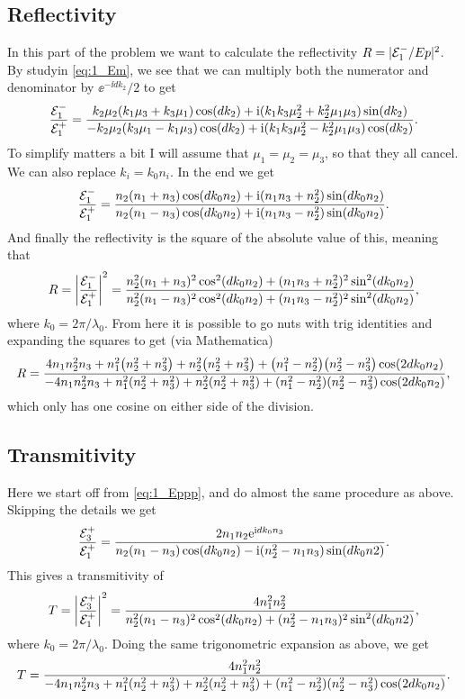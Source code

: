\documentclass[11pt,letter, swedish, english
]{article}
\begin{document}
\subsection{Reflectivity}
In this part of the problem we want to calculate the reflectivity
$R=|{\mathcal{E}_1^-}/Ep|^2$. By studyin \eqref{eq:1_Em}, we see that we can
multiply both the numerator and denominator by $\ee^{-\ii dk_2}/2$ to
get
\begin{equation}
\frac{{\mathcal{E}_1^-}}{{\mathcal{E}_1^+}}=
\frac{k_2\mu_2(k_1\mu_3 + k_3\mu_1)\cos(dk_2) 
+\mathrm{i}(k_1k_3\mu_2^2 + k_2^2\mu_1\mu_3)\sin(dk_2) 
}{
-k_2\mu_2(k_3\mu_1 - k_1\mu_3)\cos(dk_2) 
+\mathrm{i}(k_1k_3\mu_2^2 - k_2^2\mu_1\mu_3)\cos(dk_2) 
}.
\end{equation}
To simplify matters a bit I will assume that $\mu_1=\mu_2=\mu_3$, so
that they all cancel. We can also replace $k_i=k_0n_i$. In the end we
get
\begin{equation}
\frac{{\mathcal{E}_1^-}}{{\mathcal{E}_1^+}}=
\frac{n_2(n_1 + n_3)\cos(dk_0n_2) 
+\mathrm{i}(n_1n_3 + n_2^2)\sin(dk_0n_2) 
}{
n_2(n_1 - n_3)\cos(dk_0n_2) 
+\mathrm{i}(n_1n_3 - n_2^2)\sin(dk_0n_2) 
}.
\end{equation}
And finally the reflectivity is the square of the absolute value of
this, meaning that
\begin{equation}
R = \abs{\frac{{\mathcal{E}_1^-}}{{\mathcal{E}_1^+}}}^2=
\frac{n_2^2(n_1 + n_3)^2\cos^2(dk_0n_2) 
+(n_1n_3 + n_2^2)^2\sin^2(dk_0n_2) 
}{
n_2^2(n_1 - n_3)^2\cos^2(dk_0n_2) 
+(n_1n_3 - n_2^2)^2\sin^2(dk_0n_2) 
},
\end{equation}
where $k_0=2\pi/\lambda_0$.
From here it is possible to go nuts with trig identities and expanding
the squares to get (via Mathematica) 
\begin{equation}
R = 
\frac{4n_1n_2^2n_3 + n_1^2\qty(n_2^2 + n_3^2) 
+n_2^2\qty(n_2^2 + n_3^2) + \qty(n_1^2 - n_2^2)\qty(n_2^2 - n_3^2) 
\cos(2dk_0n_2)
}{
-4n_1n_2^2n_3 + n_1^2\qty(n_2^2 + n_3^2) 
+n_2^2\qty(n_2^2 + n_3^2) + \qty(n_1^2 - n_2^2)\qty(n_2^2 - n_3^2) 
\cos(2dk_0n_2)
},
\end{equation}
which only has one cosine on either side of the division.


\subsection{Transmitivity}
Here we start off from \eqref{eq:1_Eppp}, and do almost the same
procedure as above. Skipping the details we get
\begin{equation}
\frac{{\mathcal{E}_3^+}}{{\mathcal{E}_1^+}} = 
\frac{
2n_1n_2 \mathrm{e}^{\mathrm{i} dk_0n_3}
}{
n_2(n_1 - n_3)\cos(dk_0n_2) - \mathrm{i} (n_2^2 - n_1n_3)\sin(dk_0n2)}.
\end{equation}
This gives a transmitivity of
\begin{equation}
T = \abs{\frac{{\mathcal{E}_3^+}}{{\mathcal{E}_1^+}}}^2 = 
\frac{
4n_1^2n_2^2
}{
n_2^2(n_1 - n_3)^2\cos^2(dk_0n_2) + (n_2^2 - n_1n_3)^2\sin^2(dk_0n2)},
\end{equation}
where $k_0=2\pi/\lambda_0$.
Doing the same trigonometric expansion as above, we get
\begin{equation}
T = 
\frac{
4n_1^2n_2^2
}{
-4n_1n_2^2n_3 + n_1^2\qty(n_2^2 + n_3^2) 
+n_2^2\qty(n_2^2 + n_3^2) + \qty(n_1^2 - n_2^2)\qty(n_2^2 - n_3^2) 
\cos(2dk_0n_2)
}.
\end{equation}
\end{document}
